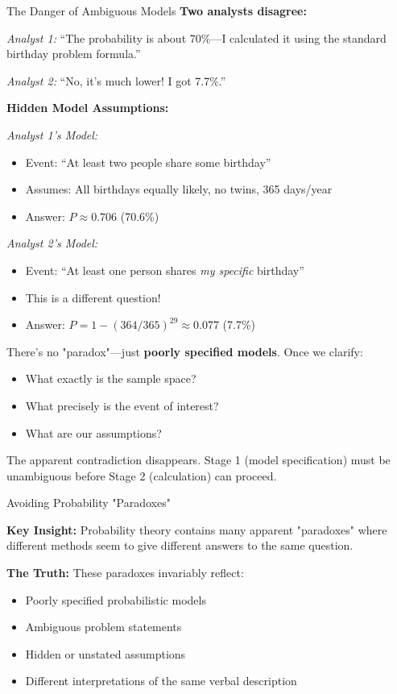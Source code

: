 \begin{itemize}
\begin{exampleboxbreak}{The Danger of Ambiguous Models}
\textbf{Two analysts disagree:}

\textit{Analyst 1:} ``The probability is about 70\%—I calculated it using the standard birthday problem formula.''

\textit{Analyst 2:} ``No, it's much lower! I got 7.7\%.''


\textbf{Hidden Model Assumptions:}

\textit{Analyst 1's Model:}
\begin{itemize}
    \item Event: ``At least two people share some birthday''
    \item Assumes: All birthdays equally likely, no twins, 365 days/year
    \item Answer: $P \approx 0.706$ (70.6\%)
\end{itemize}

\textit{Analyst 2's Model:}
\begin{itemize}
    \item Event: ``At least one person shares \textit{my specific} birthday''
    \item This is a different question!
    \item Answer: $P = 1 - (364/365)^{29} \approx 0.077$ (7.7\%)
\end{itemize}


There's no "paradox"—just \textbf{poorly specified models}. Once we clarify:
\begin{itemize}
    \item What exactly is the sample space?
    \item What precisely is the event of interest?
    \item What are our assumptions?
\end{itemize}

The apparent contradiction disappears. Stage 1 (model specification) must be unambiguous before Stage 2 (calculation) can proceed.

\end{exampleboxbreak}

\begin{keyconceptboxbreak}{Avoiding Probability "Paradoxes"}

\textbf{Key Insight:} Probability theory contains many apparent "paradoxes" where different methods seem to give different answers to the same question.

\textbf{The Truth:} These paradoxes invariably reflect:
\begin{itemize}
    \item Poorly specified probabilistic models
    \item Ambiguous problem statements
    \item Hidden or unstated assumptions
    \item Different interpretations of the same verbal description
\end{itemize}


\end{keyconceptboxbreak}
\end{itemize}
